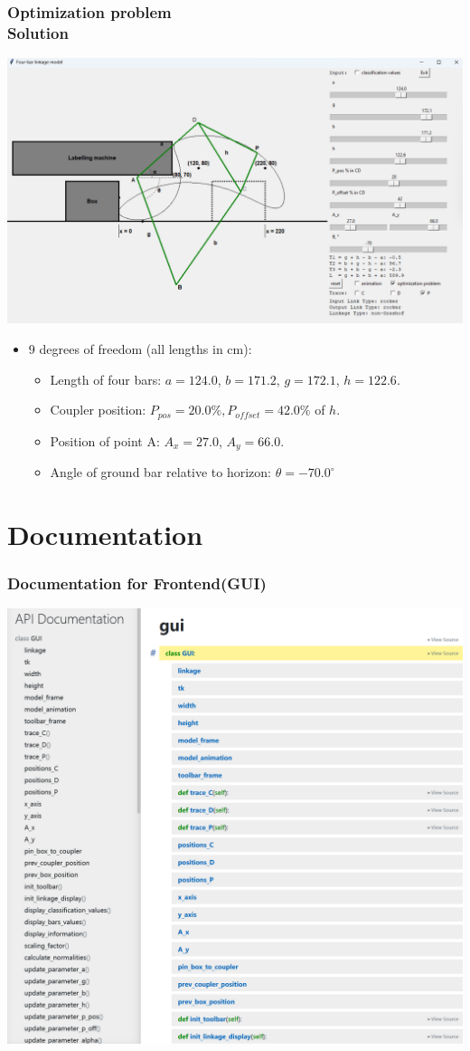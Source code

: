 \documentclass[ucs,10pt]{beamer}
\begin{document}
\begin{frame}
\frametitle{Optimization problem \\
	\small \color{rwth-blue} Solution}
	\begin{center}
		\includegraphics[width=0.82\linewidth]{./optimization_problem_solution.png}
	\end{center}
	\begin{itemize}
		\item 9 degrees of freedom (all lengths in cm):
		\begin{itemize}
			\item Length of four bars: $a = 124.0$, $b = 171.2$, $g = 172.1$, $h = 122.6$.
			\item Coupler position: $P_{pos} = 20.0 \%, P_{offset} = 42.0 \%$ of $h$.
			\item Position of point A: $A_x = 27.0$, $A_y = 66.0$.
			\item Angle of ground bar relative to horizon: $\theta = -70.0^{\circ}$
		\end{itemize}
	\end{itemize}
\end{frame}

\section{Documentation}

\begin{frame}
\frametitle{Documentation for Frontend(GUI)}
\centering
\includegraphics[height=0.65\textwidth]{./doc_gui.png}
\end{frame}
\end{document}
